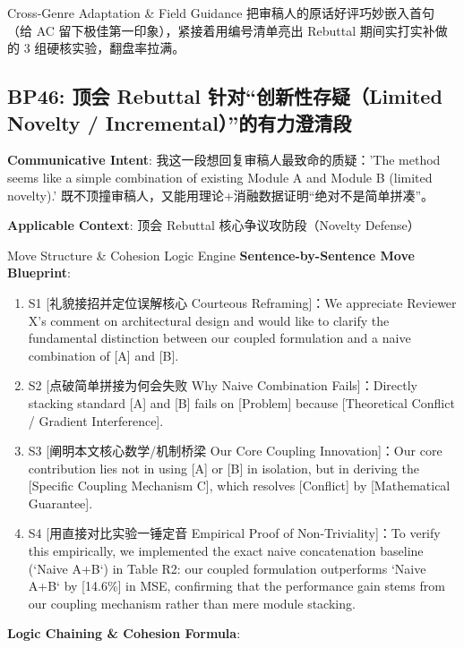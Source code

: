 \endgroup
\vspace{4pt}
\begin{TipBox}{Cross-Genre Adaptation \& Field Guidance}
把审稿人的原话好评巧妙嵌入首句（给 AC 留下极佳第一印象），紧接着用编号清单亮出 Rebuttal 期间实打实补做的 3 组硬核实验，翻盘率拉满。
\end{TipBox}
\vspace{8pt}
\subsection{BP46: 顶会 Rebuttal 针对“创新性存疑（Limited Novelty / Incremental）”的有力澄清段}\label{sec:bp:BP46}
\noindent\textbf{\color{AcadNavy}Communicative Intent}: 我这一段想回复审稿人最致命的质疑：'The method seems like a simple combination of existing Module A and Module B (limited novelty).' 既不顶撞审稿人，又能用理论+消融数据证明“绝对不是简单拼凑”。\par\vspace{2pt}
\noindent\textbf{\color{AcadSlate}Applicable Context}: 顶会 Rebuttal 核心争议攻防段（Novelty Defense）\par\vspace{4pt}
\begin{ConceptBox}{Move Structure \& Cohesion Logic Engine}
\textbf{Sentence-by-Sentence Move Blueprint}:
\begin{enumerate}[label=\textbf{\color{AcadNavy}S\arabic*.}, leftmargin=2em, itemsep=2pt]
  \item S1 [礼貌接招并定位误解核心 Courteous Reframing]：We appreciate Reviewer X's comment on architectural design and would like to clarify the fundamental distinction between our coupled formulation and a naive combination of [A] and [B].
  \item S2 [点破简单拼接为何会失败 Why Naive Combination Fails]：Directly stacking standard [A] and [B] fails on [Problem] because [Theoretical Conflict / Gradient Interference].
  \item S3 [阐明本文核心数学/机制桥梁 Our Core Coupling Innovation]：Our core contribution lies not in using [A] or [B] in isolation, but in deriving the [Specific Coupling Mechanism C], which resolves [Conflict] by [Mathematical Guarantee].
  \item S4 [用直接对比实验一锤定音 Empirical Proof of Non-Triviality]：To verify this empirically, we implemented the exact naive concatenation baseline (`Naive A+B`) in Table R2: our coupled formulation outperforms `Naive A+B` by [14.6\%] in MSE, confirming that the performance gain stems from our coupling mechanism rather than mere module stacking.
\end{enumerate}\par\vspace{4pt}
\textbf{Logic Chaining \& Cohesion Formula}:\par{}
\end{ConceptBox}
